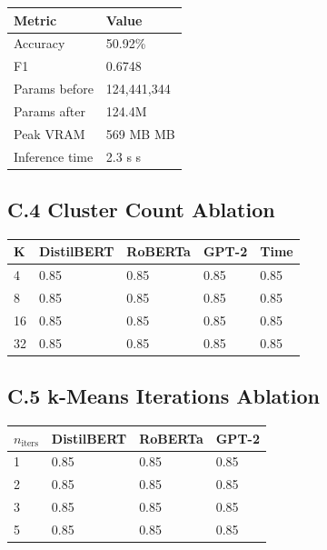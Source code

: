 \begin{table}[H]
\centering
\small
\begin{tabular}{ll}
\toprule
\textbf{Metric} & \textbf{Value} \\
\midrule
Accuracy & 50.92\% \\
F1 & 0.6748 \\
Params before & 124,441,344 \\
Params after & 124.4M \\
Peak VRAM & 569 MB MB \\
Inference time & 2.3 s s \\
\bottomrule
\end{tabular}
\end{table}

\subsection{C.4 Cluster Count Ablation}

\begin{table}[H]
\centering
\small
\begin{tabular}{lllll}
\toprule
\textbf{K} & \textbf{DistilBERT} & \textbf{RoBERTa} & \textbf{GPT-2} & \textbf{Time} \\
\midrule
4 & 0.85 & 0.85 & 0.85 & 0.85 \\
8 & 0.85 & 0.85 & 0.85 & 0.85 \\
16 & 0.85 & 0.85 & 0.85 & 0.85 \\
32 & 0.85 & 0.85 & 0.85 & 0.85 \\
\bottomrule
\end{tabular}
\end{table}

\subsection{C.5 k-Means Iterations Ablation}

\begin{table}[H]
\centering
\small
\begin{tabular}{llll}
\toprule
\textbf{$n_{\text{iters}}$} & \textbf{DistilBERT} & \textbf{RoBERTa} & \textbf{GPT-2} \\
\midrule
1 & 0.85 & 0.85 & 0.85 \\
2 & 0.85 & 0.85 & 0.85 \\
3 & 0.85 & 0.85 & 0.85 \\
5 & 0.85 & 0.85 & 0.85 \\
\bottomrule
\end{tabular}
\end{table}

